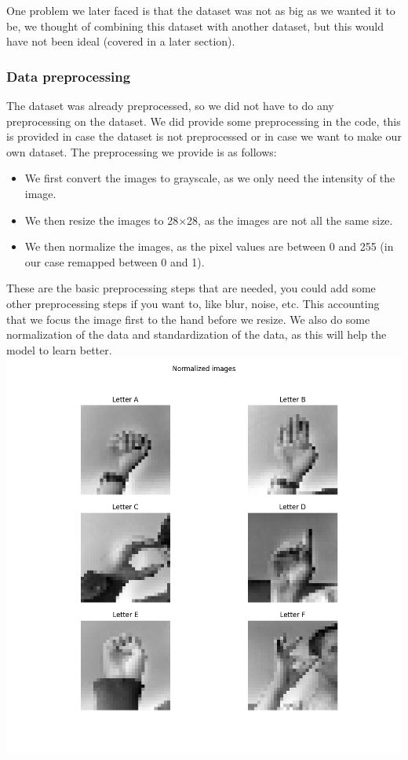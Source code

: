 \documentclass[../paper.tex]{subfiles}
\begin{document}
    One problem we later faced is that the dataset was not as big as we wanted it to be,
    we thought of combining this dataset with another dataset, but this would have not been ideal (covered in a later section).

    \subsubsection{Data preprocessing}
    The dataset was already preprocessed, so we did not have to do any preprocessing on the dataset. 
    We did provide some preprocessing in the code, this is provided in case the dataset is not preprocessed or in case we want to make our own dataset.
    The preprocessing we provide is as follows:
    \begin{itemize} 
        \item We first convert the images to grayscale, as we only need the intensity of the image.
        \item We then resize the images to 28$\times$28, as the images are not all the same size.
        \item We then normalize the images, as the pixel values are between 0 and 255 (in our case remapped between 0 and 1).
    \end{itemize} 
    These are the basic preprocessing steps that are needed, you could add some other preprocessing steps if you want to, like blur, noise, etc.
    This accounting that we focus the image first to the hand before we resize.
    We also do some normalization of the data and standardization of the data, as this will help the model to learn better. 
    \includegraphics[width=\linewidth]{letters_grid_normalized_6}
\end{document}
